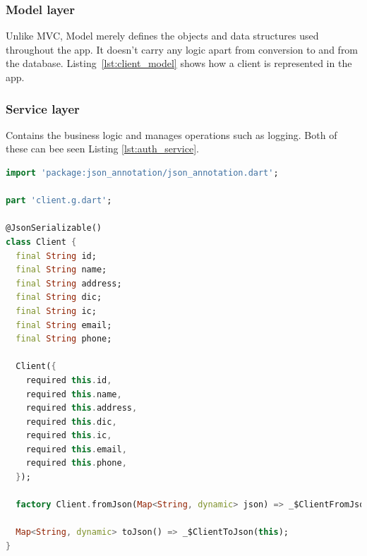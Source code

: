 \documentclass[
  digital,     %
  oneside,     %
  nosansbold,  %
  nocolorbold, %
  lof,         %
  lot,         %
]{fithesis4}
\begin{document}
\subsubsection{Model layer}
Unlike \gls{MVC}, Model merely defines the objects and data structures used throughout the app. It doesn't carry any logic apart from conversion to and from the database. Listing~\ref{lst:client_model} shows how a client is represented in the app.

\subsubsection{Service layer}

Contains the business logic and manages operations such as logging. Both of these can bee seen Listing \ref{lst:auth_service}.

\begin{listing}[H]
\centering
\begin{lstlisting}[language=Dart, caption={Model layer example on Client class}, label={lst:client_model}, floatplacement=H, showstringspaces=false, breakatwhitespace=true]
import 'package:json_annotation/json_annotation.dart';

part 'client.g.dart';

@JsonSerializable()
class Client {
  final String id;
  final String name;
  final String address;
  final String dic;
  final String ic;
  final String email;
  final String phone;

  Client({
    required this.id,
    required this.name,
    required this.address,
    required this.dic,
    required this.ic,
    required this.email,
    required this.phone,
  });

  factory Client.fromJson(Map<String, dynamic> json) => _$ClientFromJson(json);

  Map<String, dynamic> toJson() => _$ClientToJson(this);
}
\end{lstlisting}
\end{listing}
\end{document}
